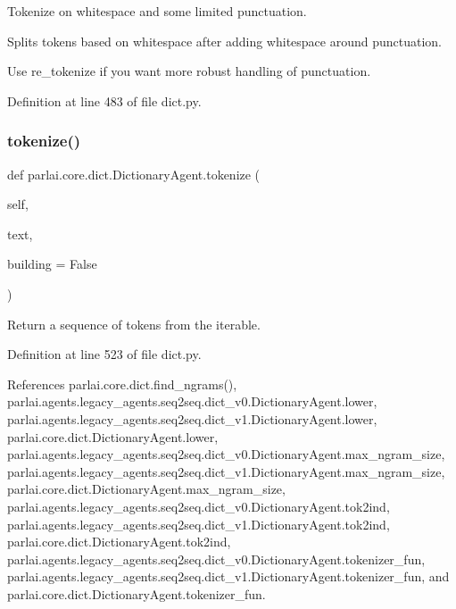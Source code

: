 \begin{DoxyVerb}Tokenize on whitespace and some limited punctuation.

Splits tokens based on whitespace after adding whitespace around
punctuation.

Use re_tokenize if you want more robust handling of punctuation.
\end{DoxyVerb}
 

Definition at line 483 of file dict.\+py.

\mbox{\label{classparlai_1_1core_1_1dict_1_1DictionaryAgent_aca7e5edfd6502701277cb83b75ff4e96}} 
\subsubsection{\texorpdfstring{tokenize()}{tokenize()}}
{\footnotesize\ttfamily def parlai.\+core.\+dict.\+Dictionary\+Agent.\+tokenize (\begin{DoxyParamCaption}\item[{}]{self,  }\item[{}]{text,  }\item[{}]{building = {\ttfamily False} }\end{DoxyParamCaption})}

\begin{DoxyVerb}Return a sequence of tokens from the iterable.\end{DoxyVerb}
 

Definition at line 523 of file dict.\+py.



References parlai.\+core.\+dict.\+find\+\_\+ngrams(), parlai.\+agents.\+legacy\+\_\+agents.\+seq2seq.\+dict\+\_\+v0.\+Dictionary\+Agent.\+lower, parlai.\+agents.\+legacy\+\_\+agents.\+seq2seq.\+dict\+\_\+v1.\+Dictionary\+Agent.\+lower, parlai.\+core.\+dict.\+Dictionary\+Agent.\+lower, parlai.\+agents.\+legacy\+\_\+agents.\+seq2seq.\+dict\+\_\+v0.\+Dictionary\+Agent.\+max\+\_\+ngram\+\_\+size, parlai.\+agents.\+legacy\+\_\+agents.\+seq2seq.\+dict\+\_\+v1.\+Dictionary\+Agent.\+max\+\_\+ngram\+\_\+size, parlai.\+core.\+dict.\+Dictionary\+Agent.\+max\+\_\+ngram\+\_\+size, parlai.\+agents.\+legacy\+\_\+agents.\+seq2seq.\+dict\+\_\+v0.\+Dictionary\+Agent.\+tok2ind, parlai.\+agents.\+legacy\+\_\+agents.\+seq2seq.\+dict\+\_\+v1.\+Dictionary\+Agent.\+tok2ind, parlai.\+core.\+dict.\+Dictionary\+Agent.\+tok2ind, parlai.\+agents.\+legacy\+\_\+agents.\+seq2seq.\+dict\+\_\+v0.\+Dictionary\+Agent.\+tokenizer\+\_\+fun, parlai.\+agents.\+legacy\+\_\+agents.\+seq2seq.\+dict\+\_\+v1.\+Dictionary\+Agent.\+tokenizer\+\_\+fun, and parlai.\+core.\+dict.\+Dictionary\+Agent.\+tokenizer\+\_\+fun.



